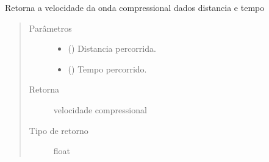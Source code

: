 \documentclass[letterpaper,10pt,brazil]{sphinxmanual}
\begin{document}

\begin{fulllineitems}
\label{\detokenize{source/base:base.velocity_p_by_distance}}
Retorna a velocidade da onda compressional dados distancia e tempo
\begin{quote}\begin{description}
\item[{Parâmetros}] \leavevmode\begin{itemize}
\item {} 
 () \textendash{} Distancia percorrida.

\item {} 
 () \textendash{} Tempo percorrido.

\end{itemize}

\item[{Retorna}] \leavevmode
velocidade compressional

\item[{Tipo de retorno}] \leavevmode
float

\end{description}\end{quote}

\end{fulllineitems}

\end{document}

